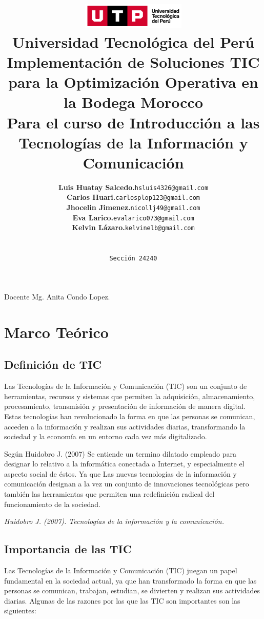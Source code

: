 \documentclass{article}
\title{
  \includegraphics[width=5cm]{./assets/logo-utp.png} \\
  \vspace{1cm}
  \textbf{Universidad Tecnológica del Perú} \\
  \vspace{2cm}
  \textbf{Implementación de Soluciones TIC para la Optimización Operativa en la Bodega Morocco} \\
  \vspace{1cm}
  \large \textbf{Para el curso de Introducción a las Tecnologías de la Información y Comunicación} \\
}
\author{
  \begin{tabular}{ll}
    \textbf{Luis Huatay Salcedo.} & \texttt{hsluis4326@gmail.com} \\
    \textbf{Carlos Huari.} & \texttt{carlosplop123@gmail.com} \\
    \textbf{Jhocelin Jimenez.} & \texttt{nicollj49@gmail.com} \\
    \textbf{Eva Larico.} & \texttt{evalarico073@gmail.com} \\
    \textbf{Kelvin Lázaro.} & \texttt{kelvinelb@gmail.com} \\
  \end{tabular} \\\\
  \texttt{Sección 24240}
}
\begin{document}
\maketitle
\begin{center}
Docente Mg. Anita Condo Lopez.
\end{center}
\restoregeometry

\newpage 

\tableofcontents

\newpage

\section{Marco Teórico}

  \subsection{Definición de TIC}

    Las Tecnologías de la Información y Comunicación (TIC) son un conjunto de herramientas, recursos y sistemas que permiten la adquisición, almacenamiento, procesamiento, transmisión y presentación de información de manera digital. Estas tecnologías han revolucionado la forma en que las personas se comunican, acceden a la información y realizan sus actividades diarias, transformando la sociedad y la economía en un entorno cada vez más digitalizado.

    Según Huidobro J. (2007) Se entiende un termino dilatado empleado para designar lo relativo a la informática conectada a Internet, y especialmente el aspecto social de éstos. Ya que Las nuevas tecnologías de la información y comunicación designan a la vez un conjunto de innovaciones tecnológicas pero también las herramientas que permiten una redefinición radical del funcionamiento de la sociedad.

    \begin{flushright}
      \textit{Huidobro J. (2007). Tecnologías de la información y la comunicación.}
    \end{flushright}



  \subsection{Importancia de las TIC}

    Las Tecnologías de la Información y Comunicación (TIC) juegan un papel fundamental en la sociedad actual, ya que han transformado la forma en que las personas se comunican, trabajan, estudian, se divierten y realizan sus actividades diarias. Algunas de las razones por las que las TIC son importantes son las siguientes:
\end{document}
